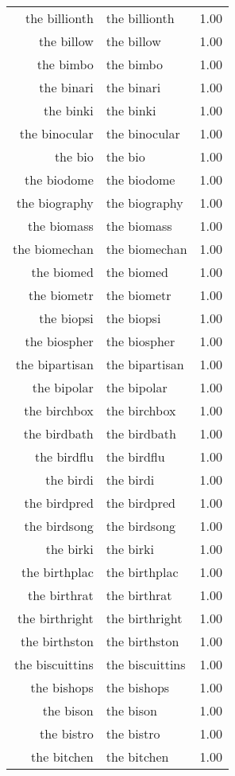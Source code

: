 \begin{table}[ht]
\begin{tabular}{rlr}
  the billionth & the billionth & 1.00 \\ 
  the billow & the billow & 1.00 \\ 
  the bimbo & the bimbo & 1.00 \\ 
  the binari & the binari & 1.00 \\ 
  the binki & the binki & 1.00 \\ 
  the binocular & the binocular & 1.00 \\ 
  the bio & the bio & 1.00 \\ 
  the biodome & the biodome & 1.00 \\ 
  the biography & the biography & 1.00 \\ 
  the biomass & the biomass & 1.00 \\ 
  the biomechan & the biomechan & 1.00 \\ 
  the biomed & the biomed & 1.00 \\ 
  the biometr & the biometr & 1.00 \\ 
  the biopsi & the biopsi & 1.00 \\ 
  the biospher & the biospher & 1.00 \\ 
  the bipartisan & the bipartisan & 1.00 \\ 
  the bipolar & the bipolar & 1.00 \\ 
  the birchbox & the birchbox & 1.00 \\ 
  the birdbath & the birdbath & 1.00 \\ 
  the birdflu & the birdflu & 1.00 \\ 
  the birdi & the birdi & 1.00 \\ 
  the birdpred & the birdpred & 1.00 \\ 
  the birdsong & the birdsong & 1.00 \\ 
  the birki & the birki & 1.00 \\ 
  the birthplac & the birthplac & 1.00 \\ 
  the birthrat & the birthrat & 1.00 \\ 
  the birthright & the birthright & 1.00 \\ 
  the birthston & the birthston & 1.00 \\ 
  the biscuittins & the biscuittins & 1.00 \\ 
  the bishops & the bishops & 1.00 \\ 
  the bison & the bison & 1.00 \\ 
  the bistro & the bistro & 1.00 \\ 
  the bitchen & the bitchen & 1.00 \\ 

\end{tabular}
\end{table}
